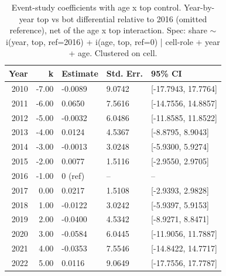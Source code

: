 \begin{table}[ht]
\centering
\caption{Event-study coefficients with age x top control. Year-by-year top vs bot differential relative to 2016 (omitted reference), net of the age x top interaction. Spec: share $\sim$ i(year, top, ref=2016) + i(age, top, ref=0) | cell-role + year + age. Clustered on cell.} 
\label{tab:phase4_within_intensive_did_agecontrol_eventstudy}
\begin{tabular}{rrlll}
  \toprule
Year & k & Estimate & Std. Err. & 95\% CI \\ 
  \midrule
2010 & -7.00 & -0.0089 & 9.0742 & [-17.7943, 17.7764] \\ 
  2011 & -6.00 & 0.0650 & 7.5616 & [-14.7556, 14.8857] \\ 
  2012 & -5.00 & -0.0032 & 6.0486 & [-11.8585, 11.8522] \\ 
  2013 & -4.00 & 0.0124 & 4.5367 & [-8.8795, 8.9043] \\ 
  2014 & -3.00 & -0.0013 & 3.0248 & [-5.9300, 5.9274] \\ 
  2015 & -2.00 & 0.0077 & 1.5116 & [-2.9550, 2.9705] \\ 
  2016 & -1.00 & 0 (ref) & -- & -- \\ 
  2017 & 0.00 & 0.0217 & 1.5108 & [-2.9393, 2.9828] \\ 
  2018 & 1.00 & -0.0122 & 3.0242 & [-5.9397, 5.9153] \\ 
  2019 & 2.00 & -0.0400 & 4.5342 & [-8.9271, 8.8471] \\ 
  2020 & 3.00 & -0.0584 & 6.0445 & [-11.9056, 11.7887] \\ 
  2021 & 4.00 & -0.0353 & 7.5546 & [-14.8422, 14.7717] \\ 
  2022 & 5.00 & 0.0116 & 9.0649 & [-17.7556, 17.7787] \\ 
   \bottomrule
\end{tabular}
\end{table}
